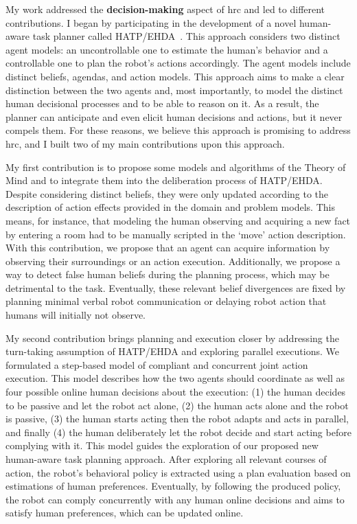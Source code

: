
My work addressed the \textbf{decision-making} aspect of \acrshort{hrc} and led to different contributions.
I began by participating in the development of a novel human-aware task planner called HATP/EHDA~\cite{buisan_hatpehda_icra}. This approach considers two distinct agent models: an uncontrollable one to estimate the human's behavior and a controllable one to plan the robot's actions accordingly. The agent models include distinct beliefs, agendas, and action models. This approach aims to make a clear distinction between the two agents and, most importantly, to model the distinct human decisional processes and to be able to reason on it. As a result, the planner can anticipate and even elicit human decisions and actions, but it never compels them. For these reasons, we believe this approach is promising to address \acrshort{hrc}, and I built two of my main contributions upon this approach.

My first contribution is to propose some models and algorithms of the Theory of Mind and to integrate them into the deliberation process of HATP/EHDA. Despite considering distinct beliefs, they were only updated according to the description of action effects provided in the domain and problem models. This means, for instance, that modeling the human observing and acquiring a new fact by entering a room had to be manually scripted in the `move' action description. With this contribution, we propose that an agent can acquire information by observing their surroundings or an action execution. Additionally, we propose a way to detect false human beliefs during the planning process, which may be detrimental to the task. Eventually, these relevant belief divergences are fixed by planning minimal verbal robot communication or delaying robot action that humans will initially not observe.

My second contribution brings planning and execution closer by addressing the turn-taking assumption of HATP/EHDA and exploring parallel executions. We formulated a step-based model of compliant and concurrent joint action execution. This model describes how the two agents should coordinate as well as four possible online human decisions about the execution: (1) the human decides to be passive and let the robot act alone, (2) the human acts alone and the robot is passive, (3) the human starts acting then the robot adapts and acts in parallel, and finally (4) the human deliberately let the robot decide and start acting before complying with it. This model guides the exploration of our proposed new human-aware task planning approach. After exploring all relevant courses of action, the robot's behavioral policy is extracted using a plan evaluation based on estimations of human preferences. Eventually, by following the produced policy, the robot can comply concurrently with any human online decisions and aims to satisfy human preferences, which can be updated online.

